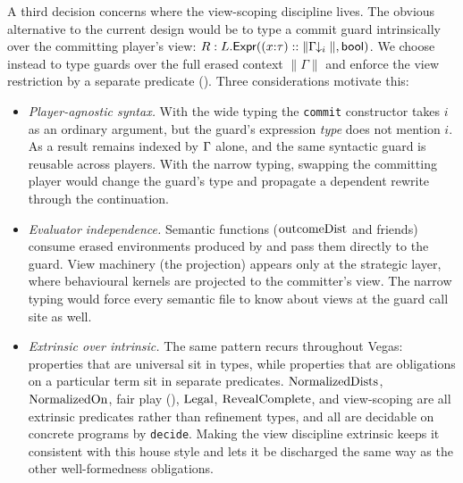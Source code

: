\documentclass[11pt]{article}
\begin{document}
A third decision concerns where the view-scoping discipline lives. The
obvious alternative to the current design would be to type a commit guard
intrinsically over the committing player's view: $R : L.\mathsf{Expr}((x{:}\tau) ::
\|\Gamma\!\!\downarrow_i\|, \mathsf{bool})$. We choose instead to type guards over
the full erased context $\|\Gamma\|$ and enforce the view restriction by a
separate predicate (). Three considerations motivate
this:
\begin{itemize}[nosep]
\item \emph{Player-agnostic syntax.} With the wide typing the
      \texttt{commit} constructor takes $i$ as an ordinary argument, but
      the guard's expression \emph{type} does not mention $i$. As a result
       remains indexed by $\Gamma$ alone, and the same syntactic
      guard is reusable across players. With the narrow typing, swapping
      the committing player would change the guard's type and propagate a
      dependent rewrite through the continuation.
\item \emph{Evaluator independence.} Semantic functions ($\mathrm{outcomeDist}$
      and friends) consume erased environments produced by
       and pass them directly to the guard. View
      machinery (the  projection) appears only at
      the strategic layer, where behavioural kernels are projected to the
      committer's view. The narrow typing would force every semantic file
      to know about views at the guard call site as well.
\item \emph{Extrinsic over intrinsic.} The same pattern recurs throughout
      Vegas: properties that are universal sit in types, while properties
      that are obligations on a particular term sit in separate
      predicates. $\mathrm{NormalizedDists}$, $\mathrm{NormalizedOn}$, fair play
      (), $\mathrm{Legal}$, $\mathrm{RevealComplete}$, and
      view-scoping are all extrinsic predicates rather than refinement
      types, and all are decidable on concrete programs by
      \texttt{decide}. Making the view discipline extrinsic keeps it
      consistent with this house style and lets it be discharged the same
      way as the other well-formedness obligations.
\end{itemize}
\end{document}
